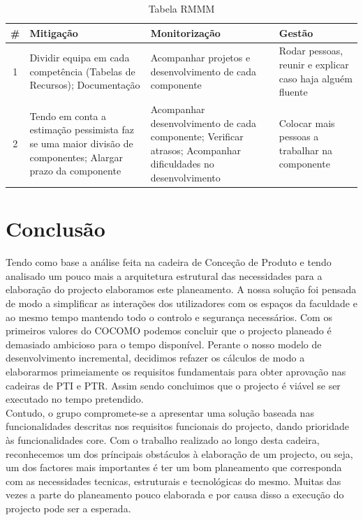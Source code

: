 \documentclass[a4paper]{report}
\begin{document}
\begin{table}[h]
\centering
\begin{tabularx}{\textwidth}{c|X|X|X}
\# & Mitigação  & Monitorização & Gestão \\ \hline
1  & Dividir equipa em cada competência (Tabelas de Recursos); Documentação                                     & Acompanhar projetos e desenvolvimento de cada componente                                                     & Rodar pessoas, reunir e explicar caso haja alguém fluente \\ \hline
2  & Tendo em conta a estimação pessimista faz se uma maior divisão de componentes; Alargar prazo da componente & Acompanhar desenvolvimento de cada componente; Verificar atrasos; Acompanhar dificuldades no desenvolvimento & Colocar mais pessoas a trabalhar na componente         
\end{tabularx}
\caption{Tabela RMMM}
\label{TabRIMM}
\end{table}
\chapter{Conclusão}

Tendo como base a análise feita na cadeira de Conceção de Produto e tendo analisado um pouco mais a arquitetura estrutural das necessidades para a elaboração do projecto elaboramos este planeamento. A nossa solução foi pensada de modo a simplificar as interações dos utilizadores com os espaços da faculdade e ao mesmo tempo mantendo todo o controlo e segurança necessários. 
Com os primeiros valores do COCOMO podemos concluir que o projecto planeado é demasiado ambicioso para o tempo disponível. Perante o nosso modelo de desenvolvimento incremental, decidimos refazer os cálculos de modo a elaborarmos primeiamente os requisitos fundamentais para obter aprovação nas cadeiras de PTI e PTR. Assim sendo concluimos que o projecto é viável se ser executado no tempo pretendido. \\
Contudo, o grupo compromete-se a apresentar uma solução baseada nas funcionalidades descritas nos requisitos funcionais do projecto, dando prioridade às funcionalidades core. Com o trabalho realizado ao longo desta cadeira, reconhecemos um dos príncipais obstáculos à elaboração de um projecto, ou seja, um dos factores mais importantes é ter um bom planeamento que corresponda com as necessidades tecnicas, estruturais e tecnológicas do mesmo. Muitas das vezes a parte do planeamento pouco elaborada e por causa disso a execução do projecto pode ser a esperada.
\clearpage
{}

\end{document}
